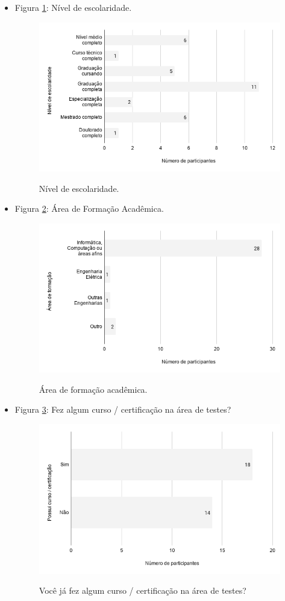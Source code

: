\begin{itemize}
    
    \item Figura \ref{figure:s_escolaridade}: Nível de escolaridade.
    \begin{figure}[!htb]
    \centering
    \includegraphics[width=.80\textwidth]{images/s_escolaridade.png}
    \label{figure:s_escolaridade}
    \caption{Nível de escolaridade.}
    \end{figure}
    
    
    \item Figura \ref{figure:s_areaformacaoacademica}: Área de Formação Acadêmica.
    \begin{figure}[!htb]
    \centering
    \includegraphics[width=.80\textwidth]{images/s_areaformacaoacademica.png}
    \label{figure:s_areaformacaoacademica}
    \caption{Área de formação acadêmica.}
    \end{figure}
    
    
    \item Figura \ref{figure:s_certificacao}: Fez algum curso / certificação na área de testes?
    \begin{figure}[!htb]
    \centering
    \includegraphics[width=.80\textwidth]{images/s_certificacao.png}
    \label{figure:s_certificacao}
    \caption{Você já fez algum curso / certificação na área de testes?}
    \end{figure}
    

\end{itemize}

